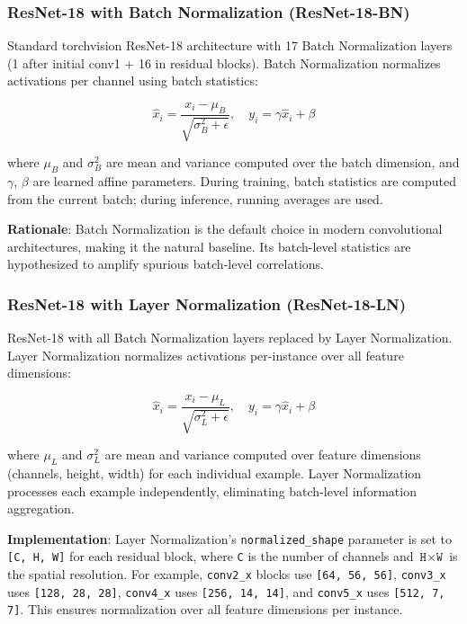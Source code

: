 \subsubsection{ResNet-18 with Batch Normalization (ResNet-18-BN)}

Standard torchvision ResNet-18 architecture with 17 Batch Normalization layers (1 after initial conv1 + 16 in residual blocks). Batch Normalization normalizes activations per channel using batch statistics:

\begin{equation}
\hat{x}_i = \frac{x_i - \mu_B}{\sqrt{\sigma_B^2 + \epsilon}}, \quad y_i = \gamma \hat{x}_i + \beta
\end{equation}

where $\mu_B$ and $\sigma_B^2$ are mean and variance computed over the batch dimension, and $\gamma$, $\beta$ are learned affine parameters. During training, batch statistics are computed from the current batch; during inference, running averages are used.

\textbf{Rationale}: Batch Normalization is the default choice in modern convolutional architectures, making it the natural baseline. Its batch-level statistics are hypothesized to amplify spurious batch-level correlations.

\subsubsection{ResNet-18 with Layer Normalization (ResNet-18-LN)}

ResNet-18 with all Batch Normalization layers replaced by Layer Normalization. Layer Normalization normalizes activations per-instance over all feature dimensions:

\begin{equation}
\hat{x}_i = \frac{x_i - \mu_L}{\sqrt{\sigma_L^2 + \epsilon}}, \quad y_i = \gamma \hat{x}_i + \beta
\end{equation}

where $\mu_L$ and $\sigma_L^2$ are mean and variance computed over feature dimensions (channels, height, width) for each individual example. Layer Normalization processes each example independently, eliminating batch-level information aggregation.

\textbf{Implementation}: Layer Normalization's \texttt{normalized\_shape} parameter is set to \texttt{[C, H, W]} for each residual block, where \texttt{C} is the number of channels and $\texttt{H} \times \texttt{W}$ is the spatial resolution. For example, \texttt{conv2\_x} blocks use \texttt{[64, 56, 56]}, \texttt{conv3\_x} uses \texttt{[128, 28, 28]}, \texttt{conv4\_x} uses \texttt{[256, 14, 14]}, and \texttt{conv5\_x} uses \texttt{[512, 7, 7]}. This ensures normalization over all feature dimensions per instance.

